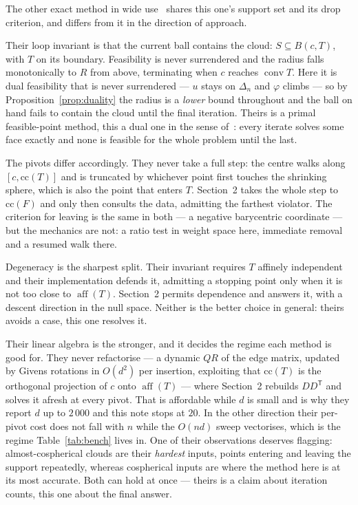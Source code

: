 \documentclass[10pt,a4paper]{article}
\theoremstyle{plain}
\theoremstyle{remark}
\DeclareMathOperator{\conv}{conv}
\DeclareMathOperator{\aff}{aff}
\newcommand{\T}{^{\mathsf{T}}}
\begin{document}
The other exact method in wide use~\cite{fischer2003} shares this one's support
set and its drop criterion, and differs from it in the direction of approach.

Their loop invariant is that the current ball contains the cloud: $S\subseteq
B(c,T)$, with $T$ on its boundary. Feasibility is never surrendered and the
radius falls monotonically to $R$ from above, terminating when $c$ reaches
$\conv T$. Here it is dual feasibility that is never surrendered --- $u$ stays on
$\Delta_n$ and $\varphi$ climbs --- so by Proposition~\ref{prop:duality} the
radius is a \emph{lower} bound throughout and the ball on hand fails to contain
the cloud until the final iteration. Theirs is a primal feasible-point method,
this a dual one in the sense of~\cite{goldfarb1983}: every iterate solves some
face exactly and none is feasible for the whole problem until the last.

The pivots differ accordingly. They never take a full step: the centre walks
along $[c,\mathrm{cc}(T)]$ and is truncated by whichever point first touches the
shrinking sphere, which is also the point that enters $T$. Section~2 takes the
whole step to $\mathrm{cc}(F)$ and only then consults the data, admitting the
farthest violator. The criterion for leaving is the same in both --- a negative
barycentric coordinate --- but the mechanics are not: a ratio test in weight
space here, immediate removal and a resumed walk there.

Degeneracy is the sharpest split. Their invariant requires $T$ affinely
independent and their implementation defends it, admitting a stopping point only
when it is not too close to $\aff(T)$. Section~2 permits dependence and answers
it, with a descent direction in the null space. Neither is the better choice in
general: theirs avoids a case, this one resolves it.

Their linear algebra is the stronger, and it decides the regime each method is
good for. They never refactorise --- a dynamic $QR$ of the edge matrix, updated
by Givens rotations in $O(d^2)$ per insertion, exploiting that
$\mathrm{cc}(T)$ is the orthogonal projection of $c$ onto $\aff(T)$ --- where
Section~2 rebuilds $DD\T$ and solves it afresh at every pivot. That is
affordable while $d$ is small and is why they report $d$ up to $2\,000$ and this
note stops at $20$. In the other direction their per-pivot cost does not fall
with $n$ while the $O(nd)$ sweep vectorises, which is the regime
Table~\ref{tab:bench} lives in. One of their observations deserves flagging:
almost-cospherical clouds are their \emph{hardest} inputs, points entering and
leaving the support repeatedly, whereas cospherical inputs are where the method
here is at its most accurate. Both can hold at once --- theirs is a claim about
iteration counts, this one about the final answer.
\end{document}
